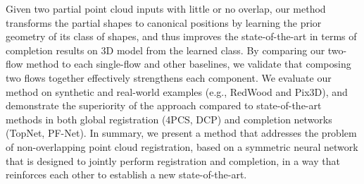 Given two partial point cloud inputs with little or no overlap, our method transforms the partial shapes to canonical positions by learning the prior geometry of its class of shapes,
and thus improves the state-of-the-art in terms of completion results on 3D model from the learned class. By comparing our two-flow method to each single-flow and other baselines, we validate that composing two flows together effectively strengthens each component. We evaluate our method on synthetic and real-world examples (e.g., RedWood and Pix3D), and demonstrate the superiority of the approach compared to state-of-the-art methods in both global registration (4PCS, DCP) and completion networks (TopNet, PF-Net).
In summary, we present a method that addresses the problem of non-overlapping point cloud registration, based on a symmetric neural network that is designed to jointly perform registration and completion, in a way that reinforces each other to establish a new state-of-the-art.
